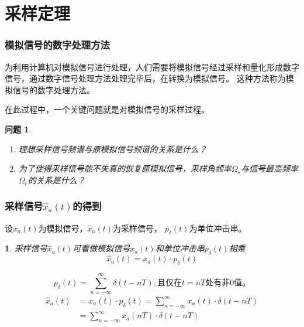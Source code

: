 \documentclass[notheorems,compress,mathserif,table]{beamer}
\newtheorem{dablock}{}
\newtheorem{wenti}{问题}
\begin{document}
\section{采样定理}
\begin{frame}[shrink]\frametitle{模拟信号的数字处理方法}%
\qquad 为利用计算机对模拟信号进行处理，人们需要将模拟信号经过采样和量化形成数字信号，通过数字信号处理方法处理完毕后，在转换为模拟信号。
这种方法称为模拟信号的数字处理方法。\par
\qquad  在此过程中，一个关键问题就是对模拟信号的采样过程。
\newline
\begin{wenti}
\begin{enumerate}
  \item 理想采样信号频谱与原模拟信号频谱的关系是什么？
  \item 为了使得采样信号能不失真的恢复原模拟信号，采样角频率$\Omega_s$与信号最高频率$\Omega_c$的关系是什么？
\end{enumerate}
\end{wenti}

\end{frame}
\begin{frame}\frametitle{采样信号$\hat{x}_a(t)$的得到}%
设$x_a(t)$为模拟信号，$\hat{x}_a(t)$为采样信号， $p_{\delta}(t)$为单位冲击串。

\begin{dablock}
采样信号$\hat{x}_a(t)$可看做模拟信号$x_a(t)$和单位冲击串$p_{\delta}(t)$相乘
$$\hat{x}_a(t) =  x_a(t)\cdot p_{\delta}(t)$$
%
\end{dablock}
$$   p_{\delta}(t)= \sum_{n=-\infty}^{\infty}\delta(t-nT),\mbox{且仅在$t=nT$处有非0值。}$$
\begin{equation*}
\begin{split}
\hat{x}_a(t)   &= x_a(t)\cdot p_{\delta}(t) =  \sum_{n=-\infty}^{\infty} x_a(t)\cdot \delta(t-nT) \\
               &=  \sum_{n=-\infty}^{\infty} x_a(nT)\cdot \delta(t-nT)
\end{split}
\end{equation*}
\end{frame}
\end{document}
